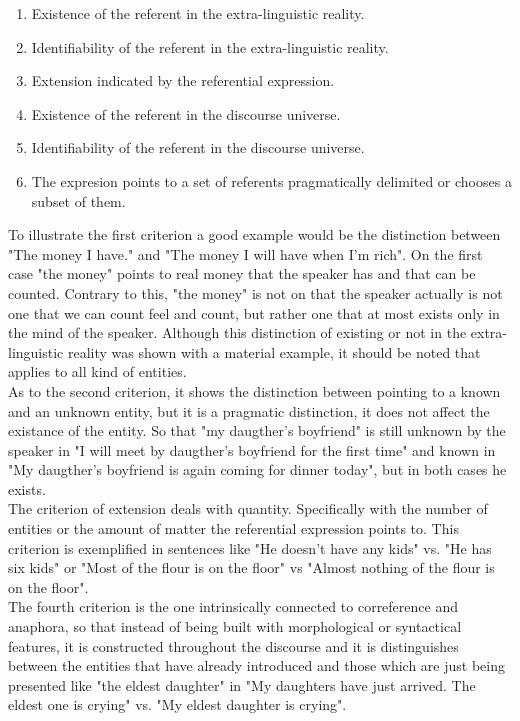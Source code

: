 \begin{enumerate}
  \item Existence of the referent in the extra-linguistic reality.
  \item Identifiability of the referent in the extra-linguistic reality.
  \item Extension indicated by the referential expression.
  \item Existence of the referent in the discourse universe.
  \item Identifiability of the referent in the discourse universe.
  \item The expresion points to a set of referents pragmatically delimited or chooses a subset of them.
\end{enumerate}

To illustrate the first criterion a good example would be the distinction between "The money I have." and "The money I will have when I'm rich". On the first case "the money" points to real money that the speaker has and that can be counted. Contrary to this, "the money" is not on that the speaker actually is not one that we can count feel and count, but rather one that at most exists only in the mind of the speaker. Although this distinction of existing or not in the extra-linguistic reality was shown with a material example, it should be noted that applies to all kind of entities.\\ 

As to the second criterion, it shows the distinction between pointing to a known and an unknown entity, but it is a pragmatic distinction, it does not affect the existance of the entity. So that "my daugther's boyfriend" is still unknown by the speaker in "I will meet by daugther's boyfriend for the first time" and known in "My daugther's boyfriend is again coming for dinner today", but in both cases he exists.\\

The criterion of extension deals with quantity. Specifically with the number of entities or the amount of matter the referential expression points to. This criterion is exemplified in sentences like "He doesn't have any kids" vs. "He has six kids" or "Most of the flour is on the floor" vs "Almost nothing of the flour is on the floor".\\

The fourth criterion is the one intrinsically connected to correference and anaphora, so that instead of being built with morphological or syntactical features, it is constructed throughout the discourse and it is distinguishes between the entities that have already introduced and those which are just being presented like "the eldest daughter" in "My daughters have just arrived. The eldest one is crying" vs. "My eldest daughter is crying".\\

